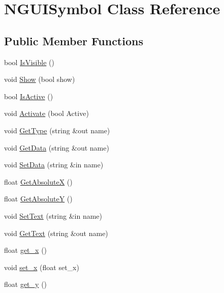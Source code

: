 \hypertarget{class_n_g_u_i_symbol}{}\section{N\+G\+U\+I\+Symbol Class Reference}
\label{class_n_g_u_i_symbol}
\subsection*{Public Member Functions}
\begin{DoxyCompactItemize}
\item 
bool \hyperlink{class_n_g_u_i_symbol_aadc54657a7852d023d514d0ebb5bd10d}{Is\+Visible} ()
\item 
void \hyperlink{class_n_g_u_i_symbol_af90d22478ab79660913920e3dc08a73f}{Show} (bool show)
\item 
bool \hyperlink{class_n_g_u_i_symbol_a551d435025b3b1a767cad57dc7311cb4}{Is\+Active} ()
\item 
void \hyperlink{class_n_g_u_i_symbol_af399bf0f4ecee8cc2af20e87504f5951}{Activate} (bool Active)
\item 
void \hyperlink{class_n_g_u_i_symbol_a6239aaf60ff44cc7cf25bfbec3599be8}{Get\+Type} (string \&out name)
\item 
void \hyperlink{class_n_g_u_i_symbol_a5ab45d0f7c60e2fed84425c257234efe}{Get\+Data} (string \&out name)
\item 
void \hyperlink{class_n_g_u_i_symbol_a0597ef7f9be738ac05c9f81f5ac2b09a}{Set\+Data} (string \&in name)
\item 
float \hyperlink{class_n_g_u_i_symbol_a4ae94ca547ad9d0b566587ea3a1d4f65}{Get\+AbsoluteX} ()
\item 
float \hyperlink{class_n_g_u_i_symbol_a81a3d18fd384affb27e23f713d887d9c}{Get\+AbsoluteY} ()
\item 
void \hyperlink{class_n_g_u_i_symbol_aa35f638beeabbdffe3288e8d1e221990}{Set\+Text} (string \&in name)
\item 
void \hyperlink{class_n_g_u_i_symbol_ac2a29b3154b6a17c28427f9c6fb4f1ac}{Get\+Text} (string \&out name)
\item 
float \hyperlink{class_n_g_u_i_symbol_ac69888a1613ece8f23ec9f48efb6bde1}{get\+\_\+x} ()
\item 
void \hyperlink{class_n_g_u_i_symbol_af70f704eb3b301dd17579f4c0b58767a}{set\+\_\+x} (float set\+\_\+x)
\item 
float \hyperlink{class_n_g_u_i_symbol_a2bc07d819b74c557a817ca32262c8531}{get\+\_\+y} ()
\item 

\end{DoxyCompactItemize}
